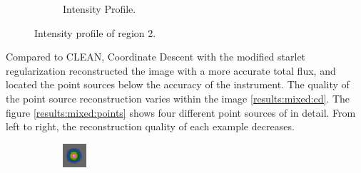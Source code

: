 \begin{figure}[h]
\begin{subfigure}[b]{0.6\linewidth}
		\caption{Intensity Profile.}
		\label{results:mixed:cut1:profile}
	\end{subfigure}
	\caption{Intensity profile of region 2.}
	\label{results:mixed:cut1:contour}
\end{figure}

Compared to CLEAN, Coordinate Descent with the modified starlet regularization reconstructed the image with a more accurate total flux, and located the point sources below the accuracy of the instrument. The quality of the point source reconstruction varies within the image \ref{results:mixed:cd}. The figure \ref{results:mixed:points} shows four different point sources of in detail. From left to right, the reconstruction quality of each example decreases.

\begin{figure}[h]
	\centering
	\begin{subfigure}[b]{0.2\linewidth}
		\includegraphics[width=\linewidth]{./chapters/20.results/mixed/problems/point1.png}
	\end{subfigure}
	\begin{subfigure}[b]{0.2\linewidth}

\end{subfigure}
\end{figure}
